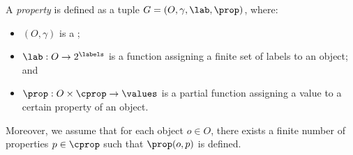 \begin{definition}
 A \emph{property \data} is defined as a tuple $G=(O,\gamma,\lab,\prop)$, where:
\begin{itemize}
    \item $(O,\gamma)$ is a \data;
    \item $\lab : O \rightarrow 2^\labels$ is a function
    assigning a finite set of labels to an object; and
    \item $\prop : O \times \cprop \rightarrow \values$ is a partial function assigning a value to a certain property of an object. 
\end{itemize}
Moreover, we assume that for each object $o \in O$, there exists a finite number of properties $p \in \cprop$ such that $\prop(o,p)$ is defined.
\end{definition}






